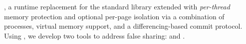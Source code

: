 \sheriff{}, a runtime replacement for the
standard \pthreads{} library extended with \emph{per-thread} memory
protection and optional per-page isolation via a combination of
processes, virtual memory support, and a differencing-based commit
protocol. Using \sheriff{}, we develop two tools to address false
sharing: \sheriffdetect{} and \sheriffprotect{}. 

\begin{comment}

Notes from Tongping:

I feel like that the following things is not good. 
(1) ``Scheduling updates can avoid false sharing'' - example. 
 If one thread’s accesses to A strictly preceded the other thread’s accesses to B, then the false sharing would cause no invalidations and hence have no performance impact.

I can't understand it and how it relates to our work.  Our work are trying to eliminate false sharing by delaying and merging the updates. Here, why not just say that delaying and merge updates from one thread can cause less updates on cache line and hence no performance impact?

(2)   specially on Linux where both pthreads and processes are invoked using the same system call (clone).
(a) According to my knowledge, there are two different system calls, fork and clone. But kernel handle that using the same function do_fork(). 
Sys_fork, Sys_vfork, Sys_clone eventually will call do_fork() to handle that.
(b) Also, using the same system call can not be used as an reason why it is inexpensive. 

(3) word-by-word --> byte-by-byte

(4) ``Sheriff only indicates the need to examine 4 cache lines'' --> 4 objects.

(5) About ``true sharing'', in fact, PTU can differentiate true
sharing from false sharing.  So in evaluation, it is not good to say
this ``Sheriff distinguishes true from false sharing'', in act, I
originally say that ``Sheriff avoid all false positives''.  False
positives can come from the following forms: (a) Few interleaving
(like benchmark4, benchmark5).  (b) Caused by heap object re-usage.

\end{comment}


